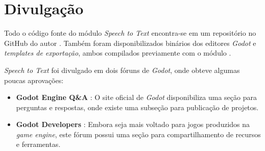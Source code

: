 
\section{Divulgação}

Todo o código fonte do módulo \textit{Speech to Text} encontra-se em um repositório no GitHub do autor \citep{sttModuleGitHub}. Também foram disponibilizados binários dos editores \textit{Godot} e \textit{templates de exportação}, ambos compilados previamente com o módulo \citep{sttModuleDownload}.


\textit{Speech to Text} foi divulgado em dois fóruns de \textit{Godot}, onde obteve algumas poucas aprovações:

\begin{itemize}
\item \textbf{Godot Engine Q\&A} \citep{sttModuleGodotQA}: O site oficial de \textit{Godot} disponibiliza uma seção para perguntas e respostas, onde existe uma subseção para publicação de projetos.

\item \textbf{Godot Developers} \citep{sttModuleGodotDevelopers}: Embora seja mais voltado para jogos produzidos na \textit{game engine}, este fórum possui uma seção para compartilhamento de recursos e ferramentas.
\end{itemize}
